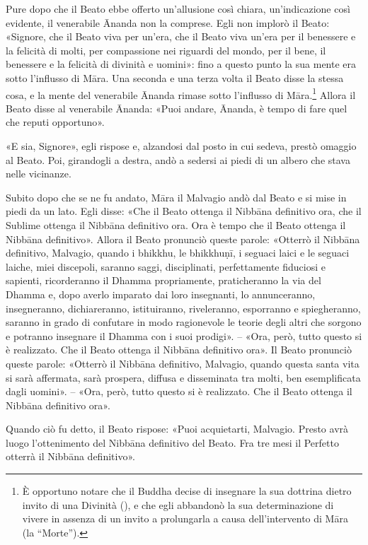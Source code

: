 Pure dopo che il Beato ebbe offerto un’allusione così chiara,
un’indicazione così evidente, il venerabile Ānanda non la comprese. Egli
non implorò il Beato: «Signore, che il Beato viva per un’era, che il
Beato viva un’era per il benessere e la felicità di molti, per
compassione nei riguardi del mondo, per il bene, il benessere e la
felicità di divinità e uomini»: fino a questo punto la sua mente era
sotto l’influsso di Māra. Una seconda e una terza volta il Beato disse
la stessa cosa, e la mente del venerabile Ānanda rimase sotto l’influsso
di Māra.\footnote{È opportuno notare che il Buddha decise di insegnare la sua dottrina dietro invito di una Divinità (\hyperlink{cap-03-Dopo-l-Illuminazione#pag45}{}), e che egli abbandonò la sua determinazione di vivere in assenza di un invito a prolungarla a causa dell’intervento di Māra (la “Morte”).} Allora il
Beato disse al venerabile Ānanda:
«Puoi andare, Ānanda, è tempo di fare quel che reputi opportuno».


«E sia, Signore», egli rispose e, alzandosi dal posto in cui sedeva,
prestò omaggio al Beato. Poi, girandogli a destra, andò a sedersi ai
piedi di un albero che stava nelle vicinanze.


Subito dopo che se ne fu andato, Māra il Malvagio andò dal Beato e si
mise in piedi da un lato. Egli disse: «Che il Beato ottenga il Nibbāna
definitivo ora, che il Sublime ottenga il Nibbāna definitivo ora. Ora è
tempo che il Beato ottenga il Nibbāna definitivo». Allora il Beato
pronunciò queste parole: «Otterrò il Nibbāna definitivo, Malvagio,
quando i bhikkhu, le bhikkhuṇī, i seguaci laici e le seguaci laiche,
miei discepoli, saranno saggi, disciplinati, perfettamente fiduciosi e
sapienti, ricorderanno il Dhamma propriamente, praticheranno la via del
Dhamma e, dopo averlo imparato dai loro insegnanti, lo annunceranno,
insegneranno, dichiareranno, istituiranno, riveleranno, esporranno e
spiegheranno, saranno in grado di confutare in modo ragionevole le
teorie degli altri che sorgono e potranno insegnare il Dhamma con i suoi
prodigi». – «Ora, però, tutto questo si è realizzato. Che il Beato
ottenga il Nibbāna definitivo ora». Il Beato pronunciò queste parole:
«Otterrò il Nibbāna definitivo, Malvagio, quando questa santa vita si
sarà affermata, sarà prospera, diffusa e disseminata tra molti, ben
esemplificata dagli uomini». – «Ora, però, tutto questo si è realizzato.
Che il Beato ottenga il Nibbāna definitivo ora».


Quando ciò fu detto, il Beato rispose: «Puoi acquietarti, Malvagio.
Presto avrà luogo l’ottenimento del Nibbāna definitivo del Beato. Fra
tre mesi il Perfetto otterrà il Nibbāna definitivo».


